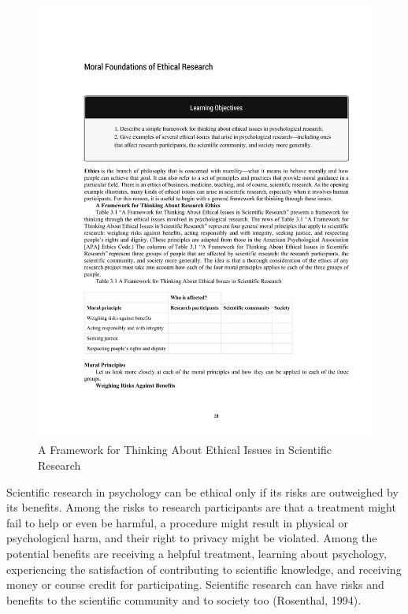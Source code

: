  \begin{figure}
       \includegraphics[width=\linewidth]{figures/C3ethicsTable.pdf}
       \caption{A Framework for Thinking About Ethical Issues in Scientific Research}
       \label{fig:EthicsTable}
 \end{figure}


Scientific research in psychology can be ethical only if its risks are outweighed by its benefits. Among the risks to research participants are that a treatment might fail to help or even be harmful, a procedure might result in physical or psychological harm, and their right to privacy might be violated. Among the potential benefits are receiving a helpful treatment, learning about psychology, experiencing the satisfaction of contributing to scientific knowledge, and receiving money or course credit for participating. Scientific research can have risks and benefits to the scientific community and to society too (Rosenthal, 1994). 


